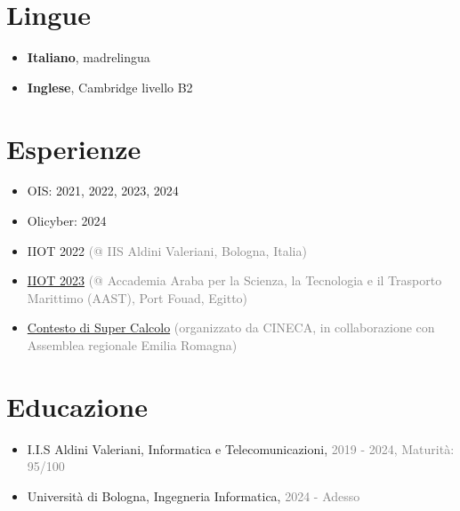 \documentclass{paper}
\begin{document}
\section{Lingue}

\begin{itemize}
    \item \textbf{Italiano}, madrelingua
    \item \textbf{Inglese}, Cambridge livello B2
\end{itemize}

\section{Esperienze}

\begin{itemize}
    \item OIS: 2021, 2022, 2023, 2024
    \item Olicyber: 2024

    \item IIOT 2022 \textcolor{gray}{(@ IIS Aldini Valeriani, Bologna, Italia)}
    \item \href{https://forum.olinfo.it/t/iiot-2023-diary/8278}{IIOT 2023} \textcolor{gray}{(@ Accademia Araba per la Scienza, la Tecnologia e il Trasporto Marittimo (AAST), Port Fouad, Egitto)}

    \item \href{https://www.ilrestodelcarlino.it/bologna/cronaca/sfida-tra-studenti-sul-supercalcolo-vincono-le-scuole-aldini-valeriani-8638a766}{Contesto di Super Calcolo} \textcolor{gray}{(organizzato da CINECA, in collaborazione con Assemblea regionale Emilia Romagna)}
\end{itemize}

\section{Educazione}

\begin{itemize}
    \item I.I.S Aldini Valeriani, Informatica e Telecomunicazioni, \textcolor{gray}{2019 - 2024, Maturità: 95/100}
    \item Università di Bologna, Ingegneria Informatica, \textcolor{gray}{2024 - Adesso}
\end{itemize}
\end{document}
